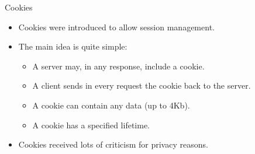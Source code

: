 \documentclass{beamer}
\begin{document}
\begin{slide}{Cookies}
  \begin{itemize}\itemsep=2ex
    \item Cookies were introduced to allow session management.
    \item The main idea is quite simple:
      \begin{itemize}\itemsep=1.5ex
      \item A server may, in any response, include a cookie.
      \item A client sends in every request the cookie back to the
        server.
      \item A cookie can contain any data (up to 4Kb).
      \item A cookie has a specified lifetime.
    \end{itemize}
  \item Cookies received lots of criticism for privacy reasons.
  \end{itemize}
\end{slide}
\end{document}
